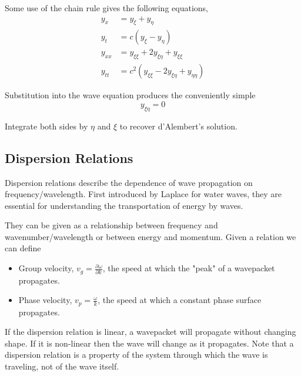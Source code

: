\documentclass[12pt]{article}
\newcommand{\partials}[3][]{\ensuremath{\frac{\partial^{#1} {#2}}{\partial {#3}^{#1}}}}
\begin{document}
Some use of the chain rule gives the following equations,
\begin{equation}
	\begin{aligned}
		y_x &= y_{\xi} + y_{\eta}\\
		y_t &= c(y_{\xi} - y_{\eta})\\
		y_{xx} &= y_{\xi\xi} + 2y_{\xi\eta} + y_{\xi\xi}\\
		y_{tt} &= c^2(y_{\xi\xi} - 2y_{\xi\eta} + y_{\eta\eta})
	\end{aligned}
\end{equation}

Substitution into the wave equation produces the conveniently simple
\begin{equation}
	y_{\xi\eta} = 0
\end{equation}

Integrate both sides by $\eta$ and $\xi$ to recover d'Alembert's solution.

\subsection{Dispersion Relations}
\label{sec:dispersionrel}

Dispersion relations describe the dependence of wave propagation on frequency/wavelength. First introduced by Laplace for water waves, they are essential for understanding the transportation of energy by waves.

\indent\hspace{15pt} They can be given as a relationship between frequency and wavenumber/wavelength or between energy and momentum. Given a relation we can define
\begin{itemize}
	\item Group velocity, $v_g = \partials{\omega}{k}$, the speed at which the "peak" of a wavepacket propagates.
	\item Phase velocity, $v_p = \frac{\omega}{k}$, the speed at which a constant phase surface propagates.
\end{itemize}

If the dispersion relation is linear, a wavepacket will propagate without changing shape. If it is non-linear then the wave will change as it propagates. Note that a dispersion relation is a property of the system through which the wave is traveling, not of the wave itself.
\end{document}

